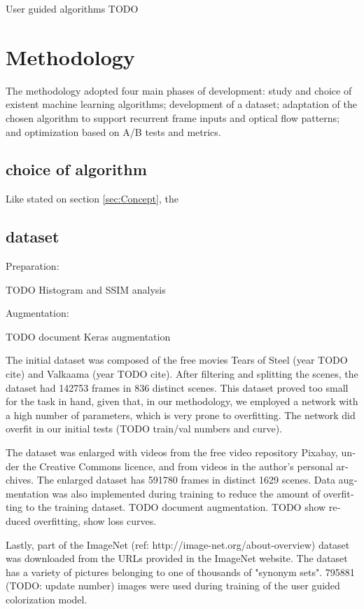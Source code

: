 \documentclass[12pt,openright,twoside,a4paper,english]{abntex2}
\begin{document}
\begin{otherlanguage}{english}
User guided algorithms TODO

\section{Methodology}
The methodology adopted four main phases of development: study and choice of existent machine learning algorithms; development of a dataset; adaptation of the chosen algorithm to support recurrent frame inputs and optical flow patterns; and optimization based on A/B tests and metrics.

\subsection{choice of algorithm}
Like stated on section \ref{sec:Concept}, the

\subsection{dataset}
Preparation:

TODO Histogram and SSIM analysis

Augmentation:

TODO document Keras augmentation

The initial dataset was composed of the free movies Tears of Steel (year TODO cite) and Valkaama (year TODO cite). After filtering and splitting the scenes, the dataset had 142753 frames in 836 distinct scenes. This dataset proved too small for the task in hand, given that, in our methodology, we employed a network with a high number of parameters, which is very prone to overfitting. The network did overfit in our initial tests (TODO train/val numbers and curve).

The dataset was enlarged with videos from the free video repository Pixabay, under the Creative Commons licence, and from videos in the author's personal archives. The enlarged dataset has 591780 frames in distinct 1629 scenes. Data augmentation was also implemented during training to reduce the amount of overfitting to the training dataset. TODO document augmentation. TODO show reduced overfitting, show loss curves.

Lastly, part of the ImageNet (ref: http://image-net.org/about-overview) dataset was downloaded from the URLs provided in the ImageNet website. The dataset has a variety of pictures belonging to one of thousands of "synonym sets". 795881 (TODO: update number) images were used during training of the user guided colorization model.


\end{otherlanguage}
\end{document}
